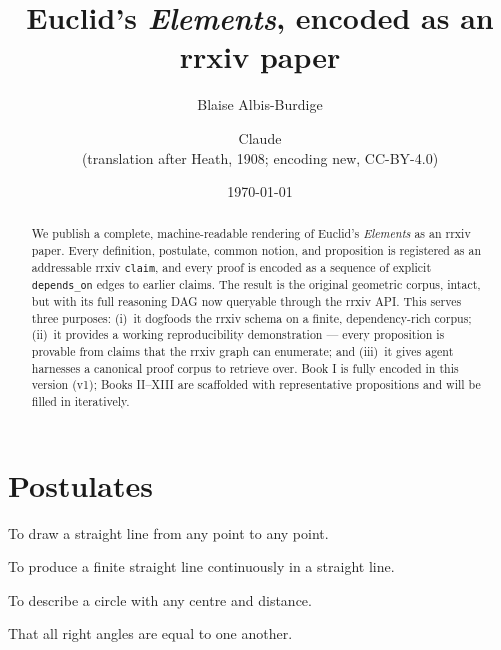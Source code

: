 \documentclass{rrxiv}
\title{Euclid's \emph{Elements}, encoded as an rrxiv paper}
\author{Blaise Albis-Burdige \and Claude \\
        \small {(translation after Heath, 1908; encoding new, CC-BY-4.0)}}
\date{\today}
\begin{document}
\maketitle

\begin{abstract}
We publish a complete, machine-readable rendering of Euclid's
\emph{Elements} as an rrxiv paper. Every definition, postulate, common
notion, and proposition is registered as an addressable rrxiv
\texttt{claim}, and every proof is encoded as a sequence of explicit
\texttt{depends\_on} edges to earlier claims. The result is the original
geometric corpus, intact, but with its full reasoning DAG now queryable
through the rrxiv API. This serves three purposes: (i)~it dogfoods the
rrxiv schema on a finite, dependency-rich corpus; (ii)~it provides a
working reproducibility demonstration --- every proposition is provable
from claims that the rrxiv graph can enumerate; and (iii)~it gives
agent harnesses a canonical proof corpus to retrieve over. Book I is
fully encoded in this version (v1); Books II--XIII are scaffolded with
representative propositions and will be filled in iteratively.
\end{abstract}

%

\section*{Postulates}
\label{sec:postulates}

\begin{rrxivremark}[Postulate~1]
\label{post:1}
To draw a straight line from any point to any point.
\end{rrxivremark}

\begin{rrxivremark}[Postulate~2]
\label{post:2}
To produce a finite straight line continuously in a straight line.
\end{rrxivremark}

\begin{rrxivremark}[Postulate~3]
\label{post:3}
To describe a circle with any centre and distance.
\end{rrxivremark}

\begin{rrxivremark}[Postulate~4]
\label{post:4}
That all right angles are equal to one another.
\end{rrxivremark}
\end{document}

